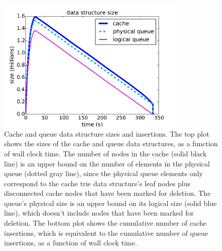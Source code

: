 \begin{arxiv}
\begin{figure}[t!]
\begin{center}
\includegraphics[width=0.8\textwidth]{figs/ela_compas-queue-cache-size-insertions.pdf}
\end{center}
\caption{Cache and queue data structure sizes and insertions.
%
The top plot shows the sizes of the cache and queue data structures,
as a function of wall clock time.
%
The number of nodes in the cache (solid black line) is an
upper bound on the number of elements in the physical queue
(dotted gray line), since the physical queue elements only
correspond to the cache trie data structure's leaf nodes
plus disconnected cache nodes that have been marked for deletion.
%
The queue's physical size is an upper bound on its
logical size (solid blue line), which doesn't include nodes
that have been marked for deletion.
%
The bottom plot shows the cumulative number of cache insertions,
which is equivalent to the cumulative number of queue insertions,
as a function of wall clock time.
}
\label{fig:queue-cache-size-insertions}
\end{figure}
\end{arxiv}

